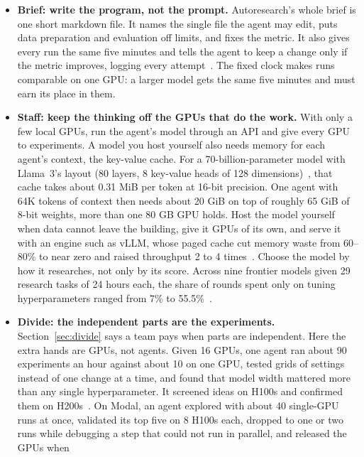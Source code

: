 \documentclass[11pt,letterpaper]{article}
\begin{document}
\begin{itemize}
  \item \textbf{Brief: write the program, not the prompt.} Autoresearch's whole brief is one
        short markdown file. It names the single file the agent may edit, puts data
        preparation and evaluation off limits, and fixes the metric. It also gives every run
        the same five minutes and tells the agent to keep a change only if the metric
        improves, logging every attempt~\cite{karpathy}. The fixed clock makes runs
        comparable on one GPU: a larger model gets the same five minutes and must earn its
        place in them.
  \item \textbf{Staff: keep the thinking off the GPUs that do the work.} With only a few
        local GPUs, run the agent's model through an API and give every GPU to experiments.
        A model you host yourself also needs memory for each agent's context, the key-value
        cache. For a 70-billion-parameter model with Llama~3's layout (80 layers, 8 key-value
        heads of 128 dimensions)~\cite{llama3}, that cache takes about 0.31 MiB per token at
        16-bit precision. One agent with 64K tokens of context then needs about 20 GiB on top
        of roughly 65 GiB of 8-bit weights, more than one 80 GB GPU holds. Host the model
        yourself when data cannot leave the building, give it GPUs of its own, and serve it
        with an engine such as vLLM, whose paged cache cut memory waste from 60--80\% to near
        zero and raised throughput 2 to 4 times~\cite{vllm}. Choose the model by how it
        researches, not only by its score. Across nine frontier models given 29 research
        tasks of 24 hours each, the share of rounds spent only on tuning hyperparameters
        ranged from 7\% to 55.5\%~\cite{bespoke}.
  \item \textbf{Divide: the independent parts are the experiments.} Section~\ref{sec:divide}
        says a team pays when parts are independent. Here the extra hands are GPUs, not
        agents. Given 16 GPUs, one agent ran about 90 experiments an hour against about 10 on
        one GPU, tested grids of settings instead of one change at a time, and found that
        model width mattered more than any single hyperparameter. It screened ideas on H100s
        and confirmed them on H200s~\cite{skypilot}. On Modal, an agent explored with about 40
        single-GPU runs at once, validated its top five on 8 H100s each, dropped to one or two
        runs while debugging a step that could not run in parallel, and released the GPUs when

\end{itemize}
\end{document}
